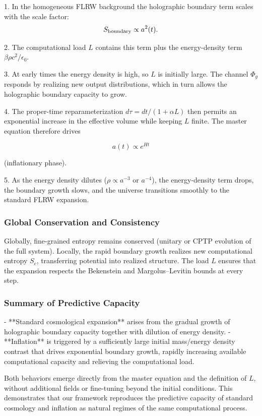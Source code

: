 \documentclass[reprint,amsmath,amssymb,aps,prd,preprintnumbers,superscriptaddress,longbibliography,10pt]{revtex4-2}
\begin{document}
1. In the homogeneous FLRW background the holographic boundary term scales with the scale factor:
   \[
   S_{\rm boundary} \propto a^2(t).
   \]

2. The computational load \(L\) contains this term plus the energy-density term \(\beta \rho c^2 / \epsilon_0\).

3. At early times the energy density is high, so \(L\) is initially large. The channel \(\Phi_g\) responds by realizing new output distributions, which in turn allows the holographic boundary capacity to grow.

4. The proper-time reparameterization \(d\tau = dt / (1 + \alpha L)\) then permits an exponential increase in the effective volume while keeping \(L\) finite. The master equation therefore drives

   \[
   a(t) \propto e^{Ht}
   \]

   (inflationary phase).

5. As the energy density dilutes (\(\rho \propto a^{-3}\) or \(a^{-4}\)), the energy-density term drops, the boundary growth slows, and the universe transitions smoothly to the standard FLRW expansion.

\subsubsection{Global Conservation and Consistency}

Globally, fine-grained entropy remains conserved (unitary or CPTP evolution of the full system). Locally, the rapid boundary growth realizes new computational entropy \(S_c\), transferring potential into realized structure. The load \(L\) ensures that the expansion respects the Bekenstein and Margolus–Levitin bounds at every step.

\subsubsection{Summary of Predictive Capacity}

- **Standard cosmological expansion** arises from the gradual growth of holographic boundary capacity together with dilution of energy density.
- **Inflation** is triggered by a sufficiently large initial mass/energy density contrast that drives exponential boundary growth, rapidly increasing available computational capacity and relieving the computational load.

Both behaviors emerge directly from the master equation and the definition of \(L\), without additional fields or fine-tuning beyond the initial conditions. This demonstrates that our framework reproduces the predictive capacity of standard cosmology and inflation as natural regimes of the same computational process.
\end{document}
